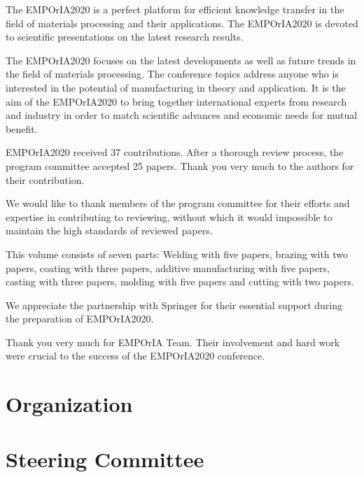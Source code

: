 \documentclass[10pt]{article}
\begin{document}
The EMPOrIA2020 is a perfect platform for efficient knowledge transfer in the field of materials processing and their applications. The EMPOrIA2020 is devoted to scientific presentations on the latest research results.

The EMPOrIA2020 focuses on the latest developments as well as future trends in the field of materials processing. The conference topics address anyone who is interested in the potential of manufacturing in theory and application. It is the aim of the EMPOrIA2020 to bring together international experts from research and industry in order to match scientific advances and economic needs for mutual benefit.

EMPOrIA2020 received 37 contributions. After a thorough review process, the program committee accepted 25 papers. Thank you very much to the authors for their contribution.

We would like to thank members of the program committee for their efforts and expertise in contributing to reviewing, without which it would impossible to maintain the high standards of reviewed papers.

This volume consists of seven parts: Welding with five papers, brazing with two papers, coating with three papers, additive manufacturing with five papers, casting with three papers, molding with five papers and cutting with two papers.

We appreciate the partnership with Springer for their essential support during the preparation of EMPOrIA2020.

Thank you very much for EMPOrIA Team. Their involvement and hard work were crucial to the success of the EMPOrIA2020 conference.

\section*{Organization}
\section*{Steering Committee}
\end{document}
